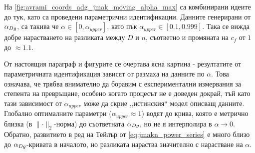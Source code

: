 На \autoref{fig:avrami_coords_adg_jmak_moving_alpha_max} са комбинирани идеите до тук, като са проведени параметрични идентификации. Данните генерирани от $\alpha_{Dg}$, са такива че $\alpha \in [0, \alpha_{upper}]$, като пък $\alpha_{upper} \in [0.1, 0.999]$. Така се вижда добре нарастването на разликата между $D$ и $n$, съответно и промяната на $c_{f}$ от $1$ до $\approx 1.1$.

От настоящия параграф и фигурите се очертава ясна картина - резултатите от параметричната идентификация зависят от размаха на данните по $\alpha$. Това означава, че трябва внимателно да боравим с експериментални измервания за степента на превръщане, особено когато процесът не е доведен докрай, тъй като тази зависимост от $\alpha_{upper}$ може да скрие ,,истинския`` модел описващ данните. 
Глобално оптималните параметри ($\alpha_{upper} \approx 1$) водят до крива, която е метрично близка (в $\lVert \cdot \rVert_{2}$-норма) до съответната $\alpha_{Dg}$, но не я интерполира в $\alpha \rightarrow 0$. Обратно, развитието в ред на Тейлър от \autoref{eq:jmakn_power_series} е много близо до $\alpha_{Dg}$-кривата в началото, но разликата нараства значително с нарастване на $\alpha$.
